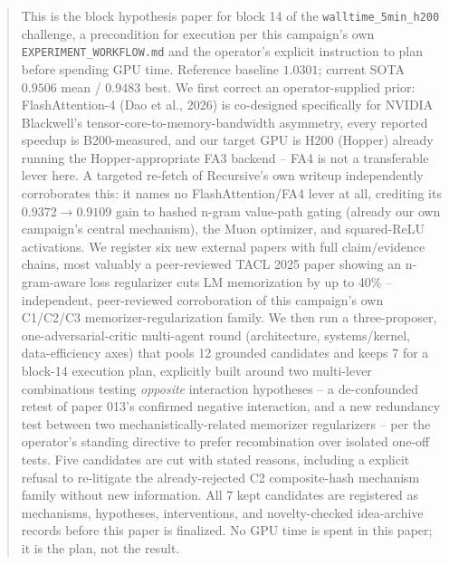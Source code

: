 \documentclass{article}
\begin{document}
\printAffiliationsAndNotice{}

\begin{abstract}
This is the block hypothesis paper for block 14 of the \texttt{walltime\_5min\_h200} challenge, a precondition for execution per this campaign's own \texttt{EXPERIMENT\_WORKFLOW.md} and the operator's explicit instruction to plan before spending GPU time. Reference baseline $1.0301$; current SOTA $0.9506$ mean / $0.9483$ best. We first correct an operator-supplied prior: FlashAttention-4 (Dao et al., 2026) is co-designed specifically for NVIDIA Blackwell's tensor-core-to-memory-bandwidth asymmetry, every reported speedup is B200-measured, and our target GPU is H200 (Hopper) already running the Hopper-appropriate FA3 backend -- FA4 is not a transferable lever here. A targeted re-fetch of Recursive's own writeup independently corroborates this: it names no FlashAttention/FA4 lever at all, crediting its $0.9372\to0.9109$ gain to hashed n-gram value-path gating (already our own campaign's central mechanism), the Muon optimizer, and squared-ReLU activations. We register six new external papers with full claim/evidence chains, most valuably a peer-reviewed TACL 2025 paper showing an n-gram-aware loss regularizer cuts LM memorization by up to 40\% -- independent, peer-reviewed corroboration of this campaign's own C1/C2/C3 memorizer-regularization family. We then run a three-proposer, one-adversarial-critic multi-agent round (architecture, systems/kernel, data-efficiency axes) that pools 12 grounded candidates and keeps 7 for a block-14 execution plan, explicitly built around two multi-lever combinations testing \emph{opposite} interaction hypotheses -- a de-confounded retest of paper 013's confirmed negative interaction, and a new redundancy test between two mechanistically-related memorizer regularizers -- per the operator's standing directive to prefer recombination over isolated one-off tests. Five candidates are cut with stated reasons, including a explicit refusal to re-litigate the already-rejected C2 composite-hash mechanism family without new information. All 7 kept candidates are registered as mechanisms, hypotheses, interventions, and novelty-checked idea-archive records before this paper is finalized. No GPU time is spent in this paper; it is the plan, not the result.
\end{abstract}
\end{document}
